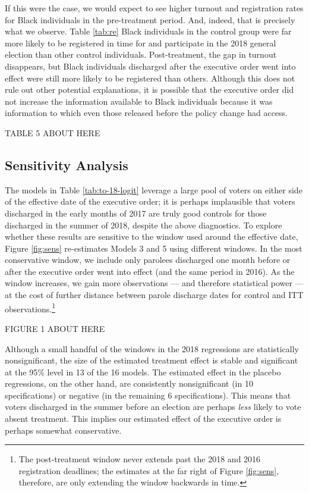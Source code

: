 \documentclass[
  12pt,
]{article}
\begin{document}
If this were the case, we would expect to see higher turnout and registration rates for Black individuals in the pre-treatment period. And, indeed, that is precisely what we observe. Table \ref{tab:re} Black individuals in the control group were far more likely to be registered in time for and participate in the 2018 general election than other control individuals. Post-treatment, the gap in turnout disappears, but Black individuals discharged after the executive order went into effect were still more likely to be registered than others. Although this does not rule out other potential explanations, it is possible that the executive order did not increase the information available to Black individuals because it was information to which even those released before the policy change had access.

TABLE 5 ABOUT HERE

\hypertarget{sensitivity-analysis}{%
\subsection*{Sensitivity Analysis}\label{sensitivity-analysis}}

The models in Table \ref{tab:to-18-logit} leverage a large pool of voters on either side of the effective date of the executive order; it is perhaps implausible that voters discharged in the early months of 2017 are truly good controls for those discharged in the summer of 2018, despite the above diagnostics. To explore whether these results are sensitive to the window used around the effective date, Figure \ref{fig:sens} re-estimates Models 3 and 5 using different windows. In the most conservative window, we include only parolees discharged one month before or after the executive order went into effect (and the same period in 2016). As the window increases, we gain more observations --- and therefore statistical power --- at the cost of further distance between parole discharge dates for control and ITT observations.\footnote{The post-treatment window never extends past the 2018 and 2016 registration deadlines; the estimates at the far right of Figure \ref{fig:sens}, therefore, are only extending the window backwards in time.}

FIGURE 1 ABOUT HERE

Although a small handful of the windows in the 2018 regressions are statistically nonsignificant, the size of the estimated treatment effect is stable and significant at the 95\% level in 13 of the 16 models. The estimated effect in the placebo regressions, on the other hand, are consistently nonsignificant (in 10 specifications) or negative (in the remaining 6 specifications). This means that voters discharged in the summer before an election are perhaps \emph{less} likely to vote absent treatment. This implies our estimated effect of the executive order is perhaps somewhat conservative.
\end{document}
